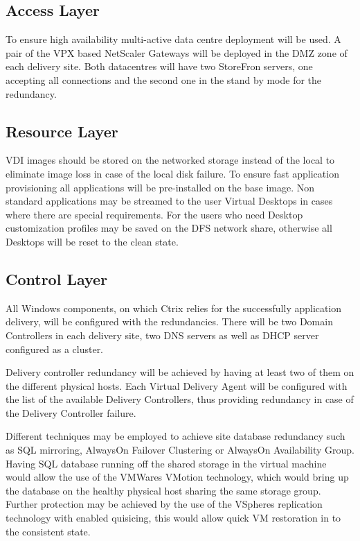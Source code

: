 \documentclass[a4paper]{article}
\begin{document}
	\subsection{Access Layer}
	
	To ensure high availability multi-active data centre deployment will be used. A pair of the VPX based NetScaler Gateways will be deployed in the DMZ zone of each delivery site. Both datacentres will have two StoreFron servers, one accepting all connections and the second one in the stand by mode for the redundancy.    
	
	\subsection{Resource Layer}
	
	VDI images should be stored on the networked storage instead of the local to eliminate image loss in case of the local disk failure. To ensure fast application provisioning all applications will be pre-installed on the base image. Non standard applications may be streamed to the user Virtual Desktops in cases where there are special requirements. For the users who need Desktop customization profiles may be saved on the DFS network share, otherwise all Desktops will be reset to the clean state.
	
	\subsection{Control Layer}
	
	All Windows components, on which Ctrix relies for the successfully application delivery, will be configured with the redundancies. There will be two Domain Controllers in each delivery site, two DNS servers as well as DHCP server configured as a cluster.
	
	Delivery controller redundancy will be achieved by having at least two of them on the different physical hosts. Each Virtual Delivery Agent will be configured with the list of the available Delivery Controllers, thus providing redundancy in case of the Delivery Controller failure. 
	
	Different techniques may be employed to achieve site database redundancy such as  SQL mirroring, AlwaysOn Failover Clustering or AlwaysOn Availability Group. Having SQL database running off the shared storage in the virtual machine would allow the use of the VMWares VMotion technology, which would bring up the database on the healthy physical host sharing the same storage group. Further protection may be achieved by the use of the VSpheres replication technology with enabled quisicing, this would allow quick VM restoration in to the consistent state.
	
\end{document}
